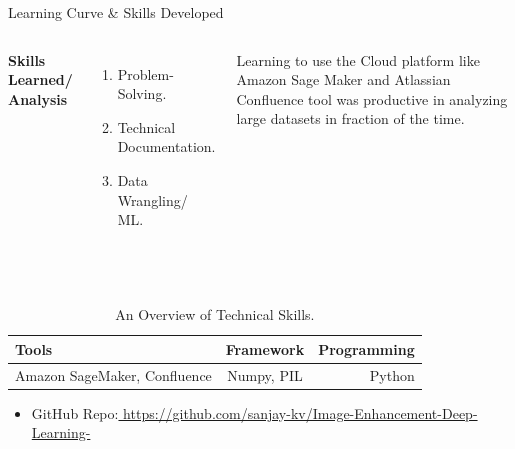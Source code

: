 \documentclass[aspectratio=169,xcolor=dvipsnames]{beamer}
\begin{document}
\begin{frame}{Learning Curve \& Skills Developed}
    \tableofcontents

    \begin{columns}[c] %

        \textbf{Skills Learned/ Analysis}
        \begin{enumerate}
            \item Problem-Solving.
            \item Technical Documentation.
            \item Data Wrangling/ ML.
        \end{enumerate}

         Learning to use the Cloud platform like Amazon Sage Maker and Atlassian Confluence tool was productive in analyzing large datasets in fraction of the time.

    \end{columns}   \\
    
\begin{table}[h!]
  \begin{center}
    \caption{An Overview of Technical Skills.}
    \label{tab:table1}
    \begin{tabular}{|l|c|r|} %
      \hline
      \textbf{Tools } & \textbf{Framework} & \textbf{Programming}\\
      
      \hline
      Amazon SageMaker, Confluence & Numpy, PIL  & Python \\
      \hline
     
    \end{tabular}
  \end{center}
\end{table}   \newline
\begin{itemize}
      
    \item \alert{GitHub Repo:}\href{ https://github.com/sanjay-kv/Image-Enhancement-Deep-Learning-}{ https://github.com/sanjay-kv/Image-Enhancement-Deep-Learning-}
 
    \end{itemize}
\end{frame}
\end{document}
